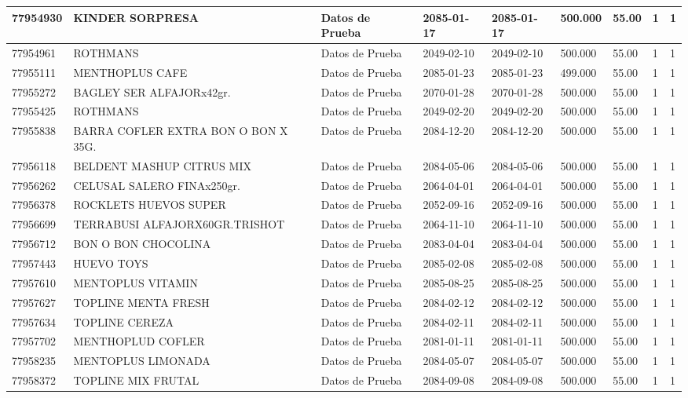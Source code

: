 \documentclass[a4paper,12pt]{article}
\begin{document}
\begin{landscape}
\begin{longtable}{|p{4cm}|p{2.5cm}|p{2.5cm}|p{1.8cm}|p{1.8cm}|p{1cm}|p{1cm}|p{3cm}|p{3cm}||}
77954930 & KINDER   SORPRESA & Datos de Prueba & 2085-01-17 & 2085-01-17 & 500.000 & 55.00 & 1 & 1 \\ \hline 
77954961 & ROTHMANS & Datos de Prueba & 2049-02-10 & 2049-02-10 & 500.000 & 55.00 & 1 & 1 \\ \hline 
77955111 & MENTHOPLUS  CAFE & Datos de Prueba & 2085-01-23 & 2085-01-23 & 499.000 & 55.00 & 1 & 1 \\ \hline 
77955272 & BAGLEY SER ALFAJORx42gr. & Datos de Prueba & 2070-01-28 & 2070-01-28 & 500.000 & 55.00 & 1 & 1 \\ \hline 
77955425 & ROTHMANS & Datos de Prueba & 2049-02-20 & 2049-02-20 & 500.000 & 55.00 & 1 & 1 \\ \hline 
77955838 & BARRA  COFLER  EXTRA   BON O BON  X 35G. & Datos de Prueba & 2084-12-20 & 2084-12-20 & 500.000 & 55.00 & 1 & 1 \\ \hline 
77956118 & BELDENT MASHUP CITRUS MIX & Datos de Prueba & 2084-05-06 & 2084-05-06 & 500.000 & 55.00 & 1 & 1 \\ \hline 
77956262 & CELUSAL SALERO FINAx250gr. & Datos de Prueba & 2064-04-01 & 2064-04-01 & 500.000 & 55.00 & 1 & 1 \\ \hline 
77956378 & ROCKLETS HUEVOS SUPER & Datos de Prueba & 2052-09-16 & 2052-09-16 & 500.000 & 55.00 & 1 & 1 \\ \hline 
77956699 & TERRABUSI ALFAJORX60GR.TRISHOT & Datos de Prueba & 2064-11-10 & 2064-11-10 & 500.000 & 55.00 & 1 & 1 \\ \hline 
77956712 & BON O BON CHOCOLINA & Datos de Prueba & 2083-04-04 & 2083-04-04 & 500.000 & 55.00 & 1 & 1 \\ \hline 
77957443 & HUEVO  TOYS & Datos de Prueba & 2085-02-08 & 2085-02-08 & 500.000 & 55.00 & 1 & 1 \\ \hline 
77957610 & MENTOPLUS  VITAMIN & Datos de Prueba & 2085-08-25 & 2085-08-25 & 500.000 & 55.00 & 1 & 1 \\ \hline 
77957627 & TOPLINE MENTA FRESH & Datos de Prueba & 2084-02-12 & 2084-02-12 & 500.000 & 55.00 & 1 & 1 \\ \hline 
77957634 & TOPLINE CEREZA & Datos de Prueba & 2084-02-11 & 2084-02-11 & 500.000 & 55.00 & 1 & 1 \\ \hline 
77957702 & MENTHOPLUD COFLER & Datos de Prueba & 2081-01-11 & 2081-01-11 & 500.000 & 55.00 & 1 & 1 \\ \hline 
77958235 & MENTOPLUS LIMONADA & Datos de Prueba & 2084-05-07 & 2084-05-07 & 500.000 & 55.00 & 1 & 1 \\ \hline 
77958372 & TOPLINE MIX FRUTAL & Datos de Prueba & 2084-09-08 & 2084-09-08 & 500.000 & 55.00 & 1 & 1 \\ \hline 

\end{longtable}
\end{landscape}
\end{document}
